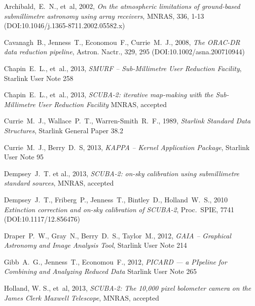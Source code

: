 \documentclass[twoside,11pt]{article}
\newcommand{\htmladdnormallink}[2]{#1}
\newcommand{\xref}[3]{#1}
\renewcommand{\_}{\texttt{\symbol{95}}}
\begin{document}
\begin{thebibliography}{}

Archibald,~E.~N., et~al, 2002, \htmladdnormallink{\textit{On the atmospheric limitations
of ground-based submillimetre astronomy using array receivers}}{
http://dx.doi.org/10.1046/j.1365-8711.2002.05582.x}, MNRAS, 336, 1-13
(DOI:10.1046/j.1365-8711.2002.05582.x)

Cavanagh~B., Jenness~T., Economou~F., Currie~M.~J., 2008,
\htmladdnormallink{\textit{The ORAC-DR data reduction
pipeline}}{http://dx.doi.org/10.1002/asna.200710944}, Astron. Nactr., 329, 295
(DOI:10.1002/asna.200710944)

Chapin~E.~L., et~al., 2013, \textit{SMURF -- Sub-Millimetre User Reduction
Facility}, \xref{Starlink User Note 258}{sun258}{}

Chapin~E.~L., et~al., 2013, \textit{SCUBA-2: iterative map-making with the
Sub-Millimetre User Reduction Facility} MNRAS,
\htmladdnormallink{accepted}{http://arxiv.org/abs/1301.3652}

Currie~M.~J., Wallace~P.~T., Warren-Smith~R.~F., 1989,
\textit{Starlink Standard Data Structures}, \xref{Starlink General
Paper 38.2}{sgp38}{}

Currie~M.~J., Berry~D.~S, 2013, \textit{KAPPA -- Kernel Application Package},
\xref{Starlink User Note 95}{sun95}{}

Dempsey~J.~T. et al., 2013, \textit{SCUBA-2: on-sky calibration using
submillimetre standard sources}, MNRAS,
\htmladdnormallink{accepted}{http://arxiv.org/abs/1301.3773}

Dempsey~J.~T., Friberg~P., Jenness~T., Bintley~D., Holland~W.~S., 2010
\htmladdnormallink{\textit{Extinction correction and on-sky calibration of
SCUBA-2}}{http://dx.doi.org/10.1117/12.856476},
Proc.\ SPIE, 7741 (DOI:10.1117/12.856476)

Draper~P.~W., Gray~N., Berry~D.~S., Taylor~M., 2012,
\textit{GAIA -- Graphical Astronomy and Image Analysis Tool},
\xref{Starlink User Note 214}{sun214}{}

Gibb~A.~G., Jenness~T., Economou~F., 2012, \textit{PICARD --- a
PIpeline for Combining and Analyzing Reduced Data}
\xref{Starlink User Note 265}{sun265}{}

Holland, W. S., et~al, 2013, \textit{SCUBA-2: The 10,000 pixel bolometer
camera on the James Clerk Maxwell Telescope}, MNRAS,
\htmladdnormallink{accepted}{http://arxiv.org/abs/1301.3650}


\end{thebibliography}
\end{document}
